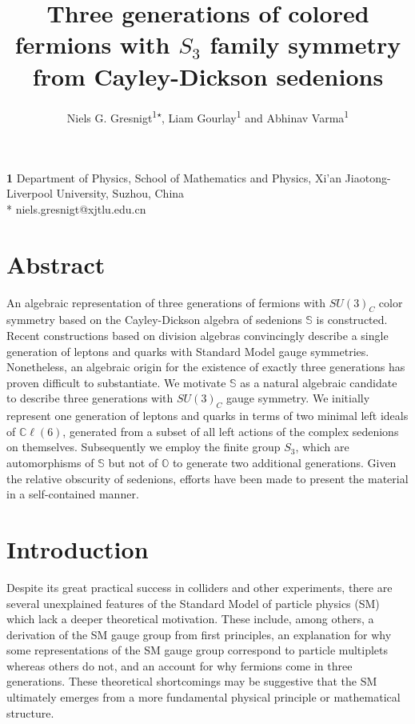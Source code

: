 \documentclass{article}
\date{}
\newcommand{\bb}[1]{\mathbb{#1}}
\begin{document}
\title{Three generations of colored fermions with $S_3$ family symmetry from Cayley-Dickson sedenions}
\maketitle
\begin{center}
\author{Niels G. Gresnigt\textsuperscript{1$\star$},
Liam Gourlay\textsuperscript{1} and
Abhinav Varma\textsuperscript{1}}
\end{center}

\begin{center}
{\bf 1} Department of Physics, School of Mathematics and Physics, Xi'an Jiaotong-Liverpool University, Suzhou, China
\\
* niels.gresnigt@xjtlu.edu.cn
\end{center}

\section*{Abstract}
An algebraic representation of three generations of fermions with $SU(3)_C$ color symmetry based on the Cayley-Dickson algebra of sedenions $\mathbb{S}$ is constructed. Recent constructions based on division algebras convincingly describe a single generation of leptons and quarks with Standard Model gauge symmetries. Nonetheless, an algebraic origin for the existence of exactly three generations has proven difficult to substantiate. We motivate $\bb{S}$ as a natural algebraic candidate to describe three generations with $SU(3)_C$ gauge symmetry. We initially represent one generation of leptons and quarks in terms of two minimal left ideals of $\bb{C}\ell(6)$, generated from a subset of all left actions of the complex sedenions on themselves. Subsequently we employ the finite group $S_3$, which are automorphisms of $\bb{S}$ but not of $\bb{O}$ to generate two additional generations. Given the relative obscurity of sedenions, efforts have been made to present the material in a self-contained manner.


\section{Introduction}\label{sec:Introduction}
Despite its great practical success in colliders and other experiments, there are several unexplained features of the Standard Model of particle physics (SM) which lack a deeper theoretical motivation. These include, among others, a derivation of the SM gauge group from first principles, an explanation for why some representations of the SM gauge group correspond to particle multiplets whereas others do not, and an account for why fermions come in three generations. These theoretical shortcomings may be suggestive that the SM ultimately emerges from a more fundamental physical principle or mathematical structure.
\end{document}
